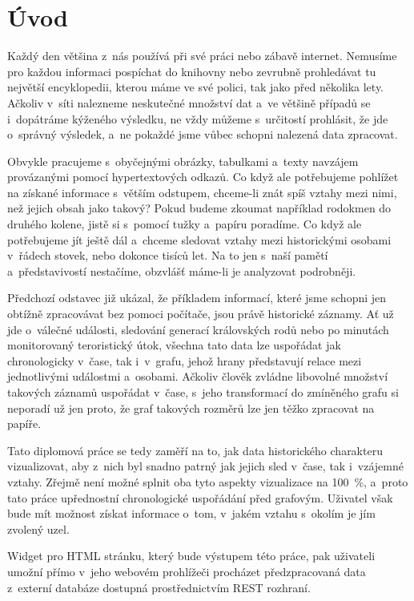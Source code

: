 \chapter{Úvod}
\label{uvod}
Každý den většina z~nás používá při své práci nebo zábavě internet. Nemusíme pro každou informaci pospíchat do knihovny nebo zevrubně prohledávat tu největší encyklopedii, kterou máme ve své polici, tak jako před několika lety. Ačkoliv v~síti nalezneme neskutečné množství dat a~ve většině případů se i~dopátráme kýženého výsledku, ne vždy můžeme s~určitostí prohlásit, že jde o~správný výsledek, a~ne pokaždé jsme vůbec schopni nalezená data zpracovat.

Obvykle pracujeme s~obyčejnými obrázky, tabulkami a~texty navzájem prová\-zanými pomocí hypertextových odkazů. Co když ale potřebujeme pohlížet na získané informace s~větším odstupem, chceme-li znát spíš vztahy mezi nimi, než jejich obsah jako takový? Pokud budeme zkoumat například rodokmen do druhého kolene, jistě si s~pomocí tužky a~papíru poradíme. Co když ale potřebujeme jít ještě dál a~chceme sledovat vztahy mezi historickými osobami v~řádech stovek, nebo dokonce tisíců let. Na to jen s~naší pamětí a~představivostí nestačíme, obzvlášť máme-li je analyzovat podrobněji.

Předchozí odstavec již ukázal, že příkladem informací, které jsme schopni jen obtížně zpracovávat bez pomoci počítače, jsou právě historické záznamy. Ať už jde o~válečné události, sledování generací královských rodů nebo po minutách monitorovaný teroristický útok, všechna tato data lze uspořádat jak chronologicky v~čase, tak i~v~grafu, jehož hrany představují relace mezi jednotlivými událostmi a~osobami. Ačkoliv člověk zvládne libovolné množství takových záznamů uspořádat v~čase, s~jeho transformací do zmíněného grafu si neporadí už jen proto, že graf takových rozměrů lze jen těžko zpracovat na papíře.

Tato diplomová práce se tedy zaměří na to, jak data historického charakteru vizualizovat, aby z~nich byl snadno patrný jak jejich sled v~čase, tak i~vzájemné vztahy. Zřejmě není možné splnit oba tyto aspekty vizualizace na 100~\%, a~proto tato práce upřednostní chronologické uspořádání před grafovým. Uživatel však bude mít možnost získat informace o~tom, v~jakém vztahu s~okolím je jím zvolený uzel. 

Widget pro HTML stránku, který bude výstupem této práce, pak uživateli umožní přímo v~jeho webovém prohlížeči procházet předzpracovaná data z~externí databáze dostupná prostřednictvím REST rozhraní.
